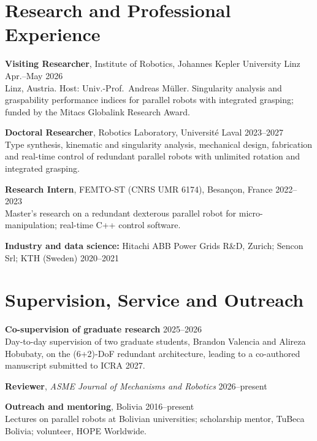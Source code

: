\documentclass[11pt,letterpaper]{article}
\newenvironment{items}{\begin{list}{}{%
  \setlength{\leftmargin}{1.4em}\setlength{\itemindent}{-0.4em}
  \setlength{\itemsep}{0.5pt}\setlength{\parsep}{0pt}\setlength{\topsep}{1pt}}}%
  {\end{list}}
\newcommand{\dateline}[1]{\hfill{\footnotesize\color{cap} #1}}
\newcommand{\venue}[1]{\emph{#1}}
\begin{document}
\section{Research and Professional Experience}
\begin{items}
\item[] \textbf{Visiting Researcher}, Institute of Robotics, Johannes Kepler University Linz \dateline{Apr.--May 2026}\\
{\footnotesize Linz, Austria. Host: Univ.-Prof.~Andreas M\"uller. Singularity analysis and graspability performance
indices for parallel robots with integrated grasping; funded by the Mitacs Globalink Research Award.}
\item[] \textbf{Doctoral Researcher}, Robotics Laboratory, Universit\'e Laval \dateline{2023--2027}\\
{\footnotesize Type synthesis, kinematic and singularity analysis, mechanical design, fabrication and real-time control
of redundant parallel robots with unlimited rotation and integrated grasping.}
\item[] \textbf{Research Intern}, FEMTO-ST (CNRS UMR 6174), Besan\c{c}on, France \dateline{2022--2023}\\
{\footnotesize Master's research on a redundant dexterous parallel robot for micro-manipulation; real-time C++ control software.}
\item[] \textbf{Industry and data science:} {\footnotesize Hitachi ABB Power Grids R\&D, Zurich; Sencon Srl; KTH (Sweden)} \dateline{2020--2021}
\end{items}

\section{Supervision, Service and Outreach}
\begin{items}
\item[] \textbf{Co-supervision of graduate research} \dateline{2025--2026}\\
{\footnotesize Day-to-day supervision of two graduate students, Brandon Valencia and Alireza Hobubaty, on the (6+2)-DoF redundant architecture, leading to a co-authored manuscript submitted to ICRA 2027.}
\item[] \textbf{Reviewer}, \venue{ASME Journal of Mechanisms and Robotics} \dateline{2026--present}
\item[] \textbf{Outreach and mentoring}, Bolivia \dateline{2016--present}\\
{\footnotesize Lectures on parallel robots at Bolivian universities; scholarship mentor, TuBeca Bolivia; volunteer, HOPE Worldwide.}
\end{items}
\end{document}

